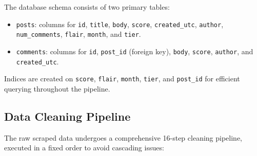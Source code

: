 \documentclass[11pt,a4paper]{article}
\begin{document}
The database schema consists of two primary tables:
\begin{itemize}[leftmargin=*]
  \item \texttt{posts}: columns for \texttt{id}, \texttt{title}, \texttt{body}, \texttt{score}, \texttt{created\_utc}, \texttt{author}, \texttt{num\_comments}, \texttt{flair}, \texttt{month}, and \texttt{tier}.
  \item \texttt{comments}: columns for \texttt{id}, \texttt{post\_id} (foreign key), \texttt{body}, \texttt{score}, \texttt{author}, and \texttt{created\_utc}.
\end{itemize}

Indices are created on \texttt{score}, \texttt{flair}, \texttt{month}, \texttt{tier}, and \texttt{post\_id} for efficient querying throughout the pipeline.


\subsection{Data Cleaning Pipeline}
\label{sec:cleaning}

The raw scraped data undergoes a comprehensive 16-step cleaning pipeline, executed in a fixed order to avoid cascading issues:
\end{document}
